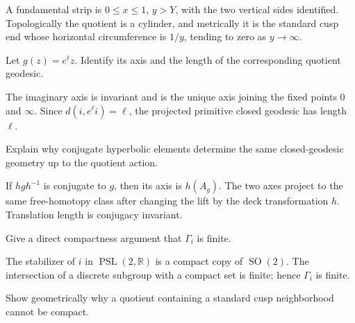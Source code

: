 \begin{solution}
A fundamental strip is \(0\le x\le1\), \(y>Y\), with the two vertical sides identified.  Topologically the quotient is a cylinder, and metrically it is the standard cusp end whose horizontal circumference is \(1/y\), tending to zero as \(y\to\infty\).
\end{solution}

\begin{problem}\label{prob:vii35-07}
Let \(g(z)=e^\ell z\).  Identify its axis and the length of the corresponding quotient geodesic.
\end{problem}

\begin{solution}
The imaginary axis is invariant and is the unique axis joining the fixed points \(0\) and \(\infty\).  Since \(d(i,e^\ell i)=\ell\), the projected primitive closed geodesic has length \(\ell\).
\end{solution}

\begin{problem}\label{prob:vii35-08}
Explain why conjugate hyperbolic elements determine the same closed-geodesic geometry up to the quotient action.
\end{problem}

\begin{solution}
If \(hgh^{-1}\) is conjugate to \(g\), then its axis is \(h(A_g)\).  The two axes project to the same free-homotopy class after changing the lift by the deck transformation \(h\).  Translation length is conjugacy invariant.
\end{solution}

\begin{problem}\label{prob:vii35-09}
Give a direct compactness argument that \(\Gamma_i\) is finite.
\end{problem}

\begin{solution}
The stabilizer of \(i\) in \(\operatorname{PSL}(2,\mathbb R)\) is a compact copy of \(\operatorname{SO}(2)\).  The intersection of a discrete subgroup with a compact set is finite; hence \(\Gamma_i\) is finite.
\end{solution}

\begin{problem}\label{prob:vii35-10}
Show geometrically why a quotient containing a standard cusp neighborhood cannot be compact.
\end{problem}

